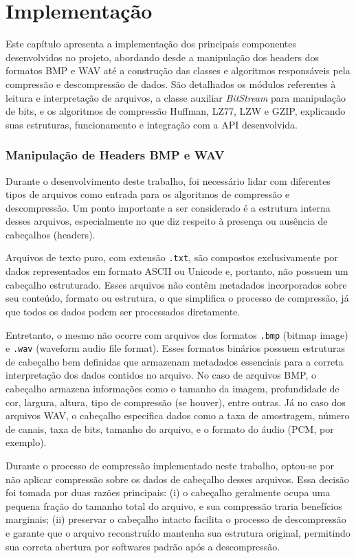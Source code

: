 \chapter{Implementação}
\label{c.împlementacao}

Este capítulo apresenta a implementação dos principais componentes desenvolvidos no projeto, abordando desde a manipulação dos headers dos formatos BMP e WAV até a construção das classes e algoritmos responsáveis pela compressão e descompressão de dados. São detalhados os módulos referentes à leitura e interpretação de arquivos, a classe auxiliar \textit{BitStream} para manipulação de bits, e os algoritmos de compressão Huffman, LZ77, LZW e GZIP, explicando suas estruturas, funcionamento e integração com a API desenvolvida.

\subsection{Manipulação de Headers BMP e WAV}

Durante o desenvolvimento deste trabalho, foi necessário lidar com diferentes tipos de arquivos como entrada para os algoritmos de compressão e descompressão. Um ponto importante a ser considerado é a estrutura interna desses arquivos, especialmente no que diz respeito à presença ou ausência de cabeçalhos (headers).

Arquivos de texto puro, com extensão \texttt{.txt}, são compostos exclusivamente por dados representados em formato ASCII ou Unicode e, portanto, não possuem um cabeçalho estruturado. Esses arquivos não contêm metadados incorporados sobre seu conteúdo, formato ou estrutura, o que simplifica o processo de compressão, já que todos os dados podem ser processados diretamente.

Entretanto, o mesmo não ocorre com arquivos dos formatos \texttt{.bmp} (bitmap image) e \texttt{.wav} (waveform audio file format). Esses formatos binários possuem estruturas de cabeçalho bem definidas que armazenam metadados essenciais para a correta interpretação dos dados contidos no arquivo. No caso de arquivos BMP, o cabeçalho armazena informações como o tamanho da imagem, profundidade de cor, largura, altura, tipo de compressão (se houver), entre outras. Já no caso dos arquivos WAV, o cabeçalho especifica dados como a taxa de amostragem, número de canais, taxa de bits, tamanho do arquivo, e o formato do áudio (PCM, por exemplo).

Durante o processo de compressão implementado neste trabalho, optou-se por não aplicar compressão sobre os dados de cabeçalho desses arquivos. Essa decisão foi tomada por duas razões principais: (i) o cabeçalho geralmente ocupa uma pequena fração do tamanho total do arquivo, e sua compressão traria benefícios marginais; (ii) preservar o cabeçalho intacto facilita o processo de descompressão e garante que o arquivo reconstruído mantenha sua estrutura original, permitindo sua correta abertura por softwares padrão após a descompressão.

